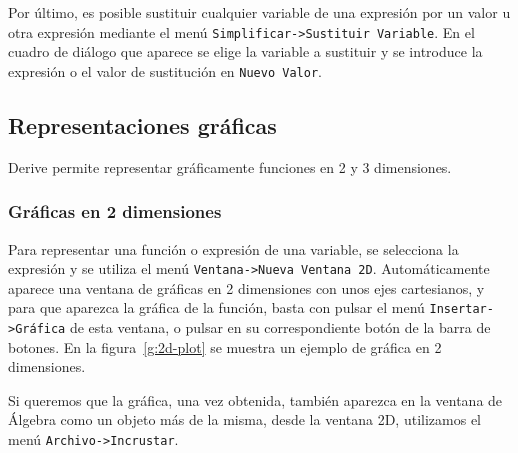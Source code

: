 Por último, es posible sustituir cualquier variable de una expresión
por un valor u otra expresión mediante el menú
\texttt{Simplificar->Sustituir Variable}. En el cuadro de diálogo
que aparece se elige la variable a sustituir y se introduce la
expresión o el valor de sustitución en \texttt{Nuevo Valor}.

\subsection*{Representaciones gráficas}
Derive permite representar gráficamente funciones en 2 y 3
dimensiones.
\subsubsection*{Gráficas en 2 dimensiones}
Para representar una función o expresión de una variable, se
selecciona la expresión y se utiliza el menú \texttt{Ventana->Nueva
Ventana 2D}. Automáticamente aparece una ventana de gráficas en 2
dimensiones con unos ejes cartesianos, y para que aparezca la
gráfica de la función, basta con pulsar el menú
\texttt{Insertar->Gráfica} de esta ventana, o pulsar en su
correspondiente botón de la barra de botones. En la
figura~\ref{g:2d-plot} se muestra un ejemplo de gráfica en 2
dimensiones.

Si queremos que la gráfica, una vez obtenida, también aparezca en la
ventana de Álgebra como un objeto más de la misma, desde la ventana
2D, utilizamos el menú \texttt{Archivo->Incrustar}.

